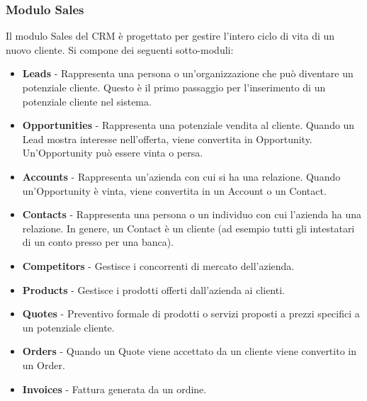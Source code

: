 \subsubsection{Modulo Sales}
Il modulo Sales del CRM è progettato per gestire l'intero ciclo di vita di un nuovo cliente. Si compone dei seguenti sotto-moduli:
\begin{itemize}
  \item \textbf{Leads} - Rappresenta una persona o un'organizzazione che può diventare un potenziale cliente. Questo è il primo passaggio per l'inserimento di un potenziale cliente nel sistema.
  \item \textbf{Opportunities} - Rappresenta una potenziale vendita al cliente. Quando un Lead mostra interesse nell'offerta, viene convertita in Opportunity. Un'Opportunity può essere vinta o persa.
  \item \textbf{Accounts} - Rappresenta un'azienda con cui si ha una relazione. Quando un'Opportunity è vinta, viene convertita in un Account o un Contact.
  \item \textbf{Contacts} - Rappresenta una persona o un individuo con cui l'azienda ha una relazione. In genere, un Contact è un cliente (ad esempio tutti gli intestatari di un conto presso per una banca).
  \item \textbf{Competitors} - Gestisce i concorrenti di mercato dell'azienda.
  \item \textbf{Products} - Gestisce i prodotti offerti dall'azienda ai clienti.
  \item \textbf{Quotes} - Preventivo formale di prodotti o servizi proposti a prezzi specifici a un potenziale cliente.
  \item \textbf{Orders} - Quando un Quote viene accettato da un cliente viene convertito in un Order.
  \item \textbf{Invoices} - Fattura generata da un ordine.
\end{itemize}

